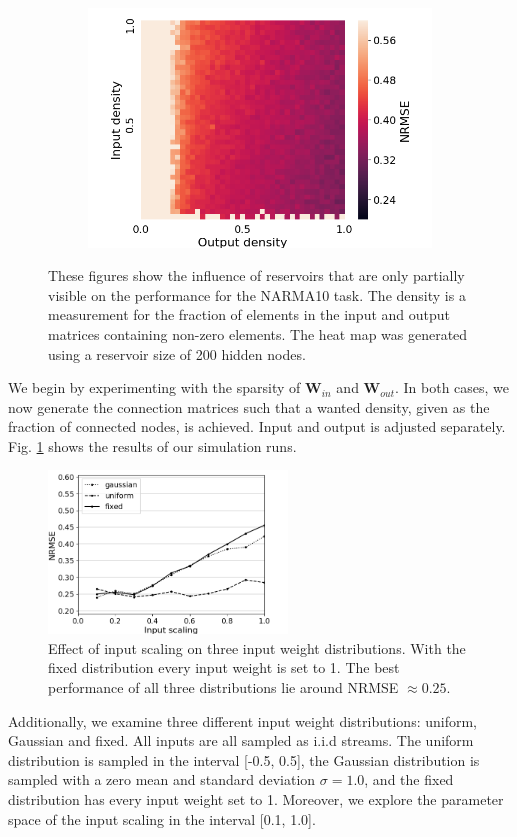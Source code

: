 \begin{figure}[htbp]
\begin{subfigure}{.3\textwidth}
    \includegraphics[width=\linewidth]{img/partial_visibility.png}
    \caption{}
  \end{subfigure}
  \caption{
    These figures show the influence of reservoirs that are only partially
visible on the performance for the NARMA10 task. The density is a measurement
for the fraction of elements in the input and output matrices containing
non-zero elements. The heat map was generated using a reservoir size of 200
hidden nodes.
  }
  \label{partial_visibility}
\end{figure}

We begin by experimenting with the sparsity of $\mathbf{W}_{in}$ and
$\mathbf{W}_{out}$. In both cases, we now generate the connection matrices such
that a wanted density, given as the fraction of connected nodes, is
achieved. Input and output is adjusted separately. Fig. \ref{partial_visibility}
shows the results of our simulation runs.

\begin{figure}[H]
  \centering
  \includegraphics[width=2.5in]{img/input_scaling_distrib.png}
  \caption{
    Effect of input scaling on three input weight distributions. With the fixed
distribution every input weight is set to 1. The best performance of all three
distributions lie around NRMSE $\approx 0.25$.
  }
  \label{input_scaling_distrib}
\end{figure}

Additionally, we examine three different input weight distributions: uniform,
Gaussian and fixed. All inputs are all sampled as i.i.d streams. The uniform
distribution is sampled in the interval [-0.5, 0.5], the Gaussian distribution
is sampled with a zero mean and standard deviation $\sigma = 1.0$, and the fixed
distribution has every input weight set to 1. Moreover, we explore the parameter
space of the input scaling in the interval [0.1, 1.0].

